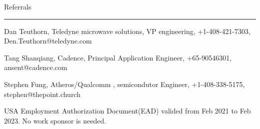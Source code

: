 { \medbreak } { \FFdd
Referrals
}
{ \smallbreak } {\par\noindent\hrule} { \smallbreak }

Dan Teuthorn, 
Teledyne microwave solutions, VP engineering,
+1-408-421-7303,
Den.Teuthorn@teledyne.com

Tang Shanqiang,
Cadence,
Principal Application Engineer,
+65-90546301,
ansent@cadence.com

Stephen Fung,
Atheros/Qualcomm , semicondutor Engineer,
+1-408-338-5175,
stephen@thepoint.church



{ \medbreak } 
{ %
USA Employment Authorization Document(EAD) valided from Feb 2021 to Feb 2023.
No work sponsor is needed.
}

\break

\bye
